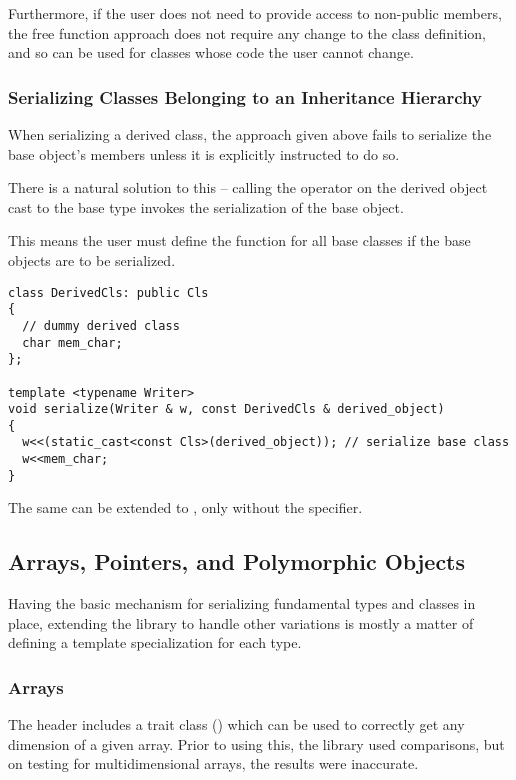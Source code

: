 \documentclass{article}
\begin{document}
Furthermore, if the user does not need to provide access to non-public
members, the free  function approach does not require
any change to the class definition, and so can be used for classes
whose code the user cannot change.

\subsubsection{Serializing Classes Belonging to an Inheritance Hierarchy}

When serializing a derived class, the approach given above fails to
serialize the base object's members unless it is explicitly instructed
to do so.

There is a natural solution to this -- calling the \code{<<} operator
on the derived object cast to the base type invokes the serialization
of the base object.

This means the user must define the  function for all
base classes if the base objects are to be serialized.

\begin{lstlisting}
class DerivedCls: public Cls
{
  // dummy derived class
  char mem_char;
};

template <typename Writer>
void serialize(Writer & w, const DerivedCls & derived_object)
{
  w<<(static_cast<const Cls>(derived_object)); // serialize base class
  w<<mem_char;
}
\end{lstlisting}

The same can be extended to , only without the
 specifier.

\subsection{Arrays, Pointers, and Polymorphic Objects}

Having the basic mechanism for serializing fundamental types and
classes in place, extending the library to handle other variations is
mostly a matter of defining a template specialization for each type.

\subsubsection{Arrays}

The  header includes a trait class ()
which can be used to correctly get any dimension of a given
array. Prior to using this, the library used 
comparisons, but on testing for multidimensional arrays, the results
were inaccurate.
\end{document}

